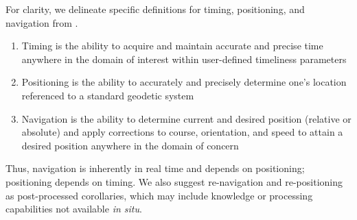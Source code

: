 
For clarity, we delineate specific definitions for timing, positioning, and navigation from \citep{howe_observing_2019}.
\begin{enumerate}
	\item Timing is the ability to acquire and maintain accurate and precise time anywhere in the domain of interest within user-defined timeliness parameters
	\item Positioning is the ability to accurately and precisely determine one's location referenced to a standard geodetic system
	\item Navigation is the ability to determine current and desired position (relative or absolute) and apply corrections to course, orientation, and speed to attain a desired position anywhere in the domain of concern
\end{enumerate}
Thus, navigation is inherently in real time and depends on positioning; positioning depends on timing.
We also suggest re-navigation and re-positioning as post-processed corollaries, which may include knowledge or processing capabilities not available \textit{in situ}.

